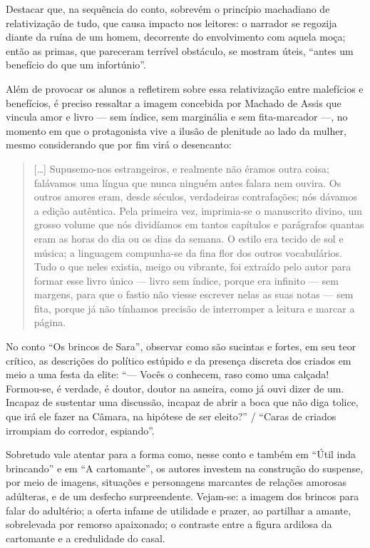 Destacar que, na sequência do conto, sobrevém o princípio machadiano de
relativização de tudo, que causa impacto nos leitores: o narrador se
regozija diante da ruína de um homem, decorrente do envolvimento com
aquela moça; então as primas, que pareceram terrível obstáculo, se
mostram úteis, ``antes um benefício do que um infortúnio''.

Além de provocar os alunos a refletirem sobre essa relativização entre
malefícios e benefícios, é preciso ressaltar a imagem concebida por
Machado de Assis que vincula amor e livro --- sem índice, sem marginália
e sem fita-marcador ---, no momento em que o protagonista vive a ilusão
de plenitude ao lado da mulher, mesmo considerando que por fim virá o
desencanto:

\begin{quote}
{[}\ldots{}{]} Supusemo-nos estrangeiros, e realmente não éramos outra
coisa; falávamos uma língua que nunca ninguém antes falara nem ouvira.
Os outros amores eram, desde séculos, verdadeiras contrafações; nós
dávamos a edição autêntica. Pela primeira vez, imprimia-se o manuscrito
divino, um grosso volume que nós dividíamos em tantos capítulos e
parágrafos quantas eram as horas do dia ou os dias da semana. O estilo
era tecido de sol e música; a linguagem compunha-se da fina flor dos
outros vocabulários. Tudo o que neles existia, meigo ou vibrante, foi
extraído pelo autor para formar esse livro único --- livro sem índice,
porque era infinito --- sem margens, para que o fastio não viesse
escrever nelas as suas notas --- sem fita, porque já não tínhamos
precisão de interromper a leitura e marcar a página.
\end{quote}

No conto ``Os brincos de Sara'', observar como são sucintas e fortes, em
seu teor crítico, as descrições do político estúpido e da presença
discreta dos criados em meio a uma festa da elite: ``--- Vocês o
conhecem, raso como uma calçada! Formou-se, é verdade, é doutor, doutor
na asneira, como já ouvi dizer de um. Incapaz de sustentar uma
discussão, incapaz de abrir a boca que não diga tolice, que irá ele
fazer na Câmara, na hipótese de ser eleito?'' / ``Caras de criados
irrompiam do corredor, espiando''.

Sobretudo vale atentar para a forma como, nesse conto e também em ``Útil
inda brincando'' e em ``A cartomante'', os autores investem na
construção do suspense, por meio de imagens, situações e personagens
marcantes de relações amorosas adúlteras, e de um desfecho
surpreendente. Vejam-se: a imagem dos brincos para falar do adultério; a
oferta infame de utilidade e prazer, ao partilhar a amante, sobrelevada
por remorso apaixonado; o contraste entre a figura ardilosa da
cartomante e a credulidade do casal.

